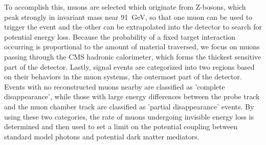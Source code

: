 To accomplish this, muons are selected which originate from Z-bosons, which peak strongly in invariant mass near \SI{91}{\giga\eV}, so that one muon can be used to trigger the event and the other can be extrapolated into the detector to search for potential energy loss.
Because the probability of a fixed target interaction occurring is proportional to the amount of material traversed, we focus on muons passing through the CMS hadronic calorimeter, which forms the thickest sensitive part of the detector.
Lastly, signal events are categorized into two regions based on their behaviors in the muon systems, the outermost part of the detector. 
Events with no reconstructed muons nearby are classified as 'complete disappearance', while those with large energy differences between the probe track and the muon chamber track are classified as 'partial disappearance' events.
By using these two categories, the rate of muons undergoing invisible energy loss is determined and then used to set a limit on the potential coupling between standard model photons and potential dark matter mediators.

